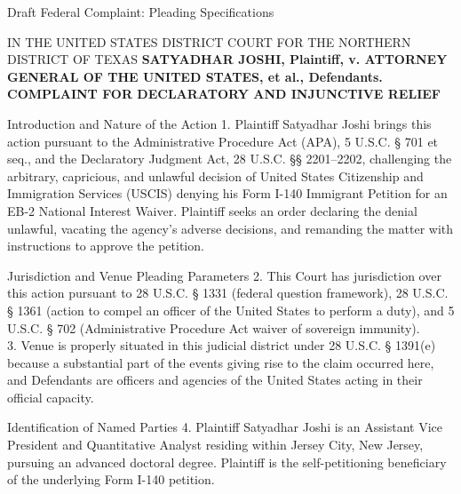 \documentclass[11pt]{beamer}
\begin{document}
	\begin{frame}[allowframebreaks]{Draft Federal Complaint: Pleading Specifications}
		\scriptsize
		\begin{block}{IN THE UNITED STATES DISTRICT COURT FOR THE NORTHERN DISTRICT OF TEXAS}
			\textbf{SATYADHAR JOSHI, Plaintiff, v. ATTORNEY GENERAL OF THE UNITED STATES, et al., Defendants.} \\
			\vspace{0.2cm}
			\textbf{COMPLAINT FOR DECLARATORY AND INJUNCTIVE RELIEF}
		\end{block}
		\framebreak
		\begin{block}{Introduction and Nature of the Action}
			1. Plaintiff Satyadhar Joshi brings this action pursuant to the Administrative Procedure Act (APA), 5 U.S.C. § 701 et seq., and the Declaratory Judgment Act, 28 U.S.C. §§ 2201–2202, challenging the arbitrary, capricious, and unlawful decision of United States Citizenship and Immigration Services (USCIS) denying his Form I-140 Immigrant Petition for an EB-2 National Interest Waiver. Plaintiff seeks an order declaring the denial unlawful, vacating the agency's adverse decisions, and remanding the matter with instructions to approve the petition.
		\end{block}
		\framebreak
		\begin{block}{Jurisdiction and Venue Pleading Parameters}
			2. This Court has jurisdiction over this action pursuant to 28 U.S.C. § 1331 (federal question framework), 28 U.S.C. § 1361 (action to compel an officer of the United States to perform a duty), and 5 U.S.C. § 702 (Administrative Procedure Act waiver of sovereign immunity). \\
			3. Venue is properly situated in this judicial district under 28 U.S.C. § 1391(e) because a substantial part of the events giving rise to the claim occurred here, and Defendants are officers and agencies of the United States acting in their official capacity.
		\end{block}
		\framebreak
		\begin{block}{Identification of Named Parties}
			4. Plaintiff Satyadhar Joshi is an Assistant Vice President and Quantitative Analyst residing within Jersey City, New Jersey, pursuing an advanced doctoral degree. Plaintiff is the self-petitioning beneficiary of the underlying Form I-140 petition. \\

\end{block}
\end{frame}
\end{document}
